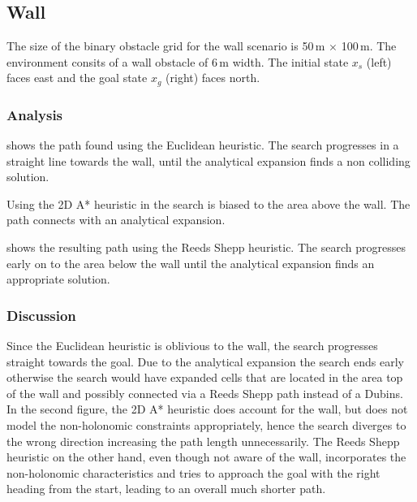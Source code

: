 \subsection{Wall}
The size of the binary obstacle grid for the wall scenario is 50\,m $\times$ 100\,m. The environment consits of a wall obstacle of 6\,m width. The initial state $x_s$ (left) faces east and the goal state $x_g$ (right) faces north.

\subsubsection{Analysis}

 shows the path found using the Euclidean heuristic. The search progresses in a straight line towards the wall, until the analytical expansion finds a non colliding solution.

Using the 2D A* heuristic in  the search is biased to the area above the wall. The path connects with an analytical expansion.

 shows the resulting path using the Reeds Shepp heuristic. The search progresses early on to the area below the wall until the analytical expansion finds an appropriate solution.

\subsubsection{Discussion}
Since the Euclidean heuristic is oblivious to the wall, the search progresses straight towards the goal. Due to the analytical expansion the search ends early otherwise the search would have expanded cells that are located in the area top of the wall and possibly connected via a Reeds Shepp path instead of a Dubins. In the second figure, the 2D A* heuristic does account for the wall, but does not model the non-holonomic constraints appropriately, hence the search diverges to the wrong direction increasing the path length unnecessarily. The Reeds Shepp heuristic on the other hand, even though not aware of the wall, incorporates the non-holonomic characteristics and tries to approach the goal with the right heading from the start, leading to an overall much shorter path.

